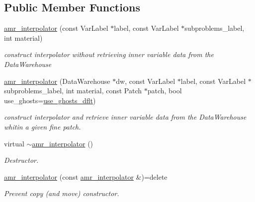 \subsection*{Public Member Functions}
\begin{DoxyCompactItemize}
\item 
\hyperlink{classUintah_1_1PhaseField_1_1detail_1_1amr__interpolator_3_01ScalarField_3_01T_01_4_00_01Problemdf68628a6010a1e1526666730125c372_a8580864e454adb1e3b4edea25eb2e9d9}{amr\+\_\+interpolator} (const Var\+Label $\ast$label, const Var\+Label $\ast$subproblems\+\_\+label, int material)
\begin{DoxyCompactList}\small\item\em construct interpolator without retrieving inner variable data from the Data\+Warehouse \end{DoxyCompactList}\item 
\hyperlink{classUintah_1_1PhaseField_1_1detail_1_1amr__interpolator_3_01ScalarField_3_01T_01_4_00_01Problemdf68628a6010a1e1526666730125c372_abe39c29b1413dd0cbc8a0b7b86c658e6}{amr\+\_\+interpolator} (Data\+Warehouse $\ast$dw, const Var\+Label $\ast$label, const Var\+Label $\ast$subproblems\+\_\+label, int material, const Patch $\ast$patch, bool use\+\_\+ghosts=\hyperlink{classUintah_1_1PhaseField_1_1detail_1_1amr__interpolator_3_01ScalarField_3_01T_01_4_00_01Problemdf68628a6010a1e1526666730125c372_ac8949b5e1e12de5843d579bed1556ddb}{use\+\_\+ghosts\+\_\+dflt})
\begin{DoxyCompactList}\small\item\em construct interpolator and retrieve inner variable data from the Data\+Warehouse whitin a given fine patch. \end{DoxyCompactList}\item 
virtual \hyperlink{classUintah_1_1PhaseField_1_1detail_1_1amr__interpolator_3_01ScalarField_3_01T_01_4_00_01Problemdf68628a6010a1e1526666730125c372_afed7a05333a90833b66c23731cf7f512}{$\sim$amr\+\_\+interpolator} ()
\begin{DoxyCompactList}\small\item\em Destructor. \end{DoxyCompactList}\item 
\hyperlink{classUintah_1_1PhaseField_1_1detail_1_1amr__interpolator_3_01ScalarField_3_01T_01_4_00_01Problemdf68628a6010a1e1526666730125c372_a982aa701741ac38691e8c36c81bf6898}{amr\+\_\+interpolator} (const \hyperlink{classUintah_1_1PhaseField_1_1detail_1_1amr__interpolator}{amr\+\_\+interpolator} \&)=delete
\begin{DoxyCompactList}\small\item\em Prevent copy (and move) constructor. \end{DoxyCompactList}\item 

\end{DoxyCompactItemize}
